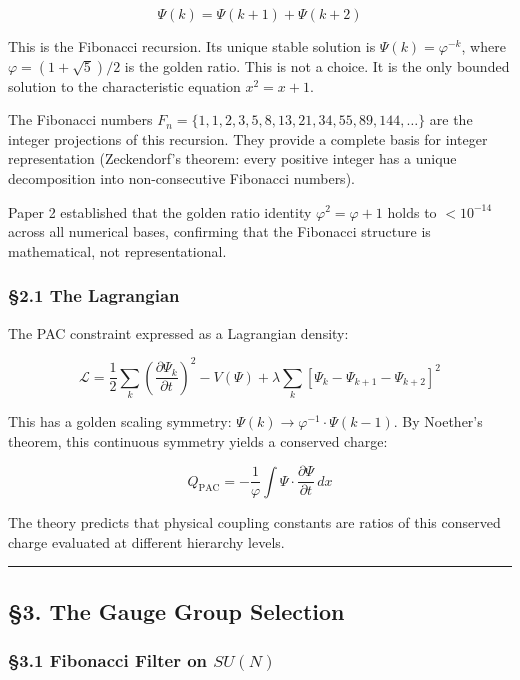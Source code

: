\documentclass[
  11pt,
  a4paper]{article}
\begin{document}
\[\Psi(k) = \Psi(k+1) + \Psi(k+2)\]

This is the Fibonacci recursion. Its unique stable solution is
\(\Psi(k) = \varphi^{-k}\), where \(\varphi = (1 + \sqrt{5})/2\) is the
golden ratio. This is not a choice. It is the only bounded solution to
the characteristic equation \(x^2 = x + 1\).

The Fibonacci numbers
\(F_n = \{1, 1, 2, 3, 5, 8, 13, 21, 34, 55, 89, 144, \ldots\}\) are the
integer projections of this recursion. They provide a complete basis for
integer representation (Zeckendorf's theorem: every positive integer has
a unique decomposition into non-consecutive Fibonacci numbers).

Paper 2 established that the golden ratio identity
\(\varphi^2 = \varphi + 1\) holds to \(< 10^{-14}\) across all numerical
bases, confirming that the Fibonacci structure is mathematical, not
representational.

\subsubsection{§2.1 The Lagrangian}\label{the-lagrangian}

The PAC constraint expressed as a Lagrangian density:

\[\mathcal{L} = \frac{1}{2}\sum_k \left(\frac{\partial\Psi_k}{\partial t}\right)^2 - V(\Psi) + \lambda \sum_k [\Psi_k - \Psi_{k+1} - \Psi_{k+2}]^2\]

This has a golden scaling symmetry:
\(\Psi(k) \to \varphi^{-1} \cdot \Psi(k-1)\). By Noether's theorem, this
continuous symmetry yields a conserved charge:

\[Q_{\text{PAC}} = -\frac{1}{\varphi} \int \Psi \cdot \frac{\partial\Psi}{\partial t} \, dx\]

The theory predicts that physical coupling constants are ratios of this
conserved charge evaluated at different hierarchy levels.

\begin{center}\rule{0.5\linewidth}{0.5pt}\end{center}

\subsection{§3. The Gauge Group
Selection}\label{the-gauge-group-selection}

\subsubsection{\texorpdfstring{§3.1 Fibonacci Filter on
\(SU(N)\)}{§3.1 Fibonacci Filter on SU(N)}}\label{fibonacci-filter-on-sun}
\end{document}
